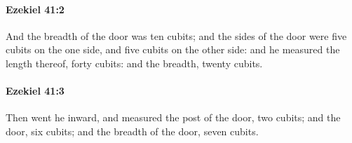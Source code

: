 		\paragraph{Ezekiel 41:2} %
			\label{EZEKIEL-41-2}

			And the breadth of the door was ten cubits; and the sides of the door were five cubits on the one side, and five cubits on the other side: and he measured the length thereof, forty cubits: and the breadth, twenty cubits.


		\paragraph{Ezekiel 41:3} %
			\label{EZEKIEL-41-3}

			Then went he inward, and measured the post of the door, two cubits; and the door, six cubits; and the breadth of the door, seven cubits.


